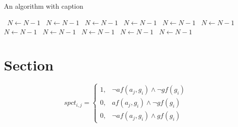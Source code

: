 \documentclass[a4paper]{article}
\begin{document}
\begin{algorithm}
\caption{An algorithm with caption}
\begin{algorithmic}
\    \State $N \gets N - 1$
\    \State $N \gets N - 1$
\    \State $N \gets N - 1$
\    \State $N \gets N - 1$
\    \State $N \gets N - 1$
\    \State $N \gets N - 1$
\    \State $N \gets N - 1$
\    \State $N \gets N - 1$
\    \State $N \gets N - 1$
\    \State $N \gets N - 1$
\    \State $N \gets N - 1$
\EndWhile
\end{algorithmic}
\end{algorithm}

\section{Section}

\begin{equation}
spct_{i,j} =
\begin{cases}
1, & \text{$\neg af(a_j,g_i) \wedge \neg gf(g_i)$}\\
0, & \text{$af(a_j,g_i) \wedge \neg gf(g_i)$}\\
0, & \text{$\neg af(a_j,g_i) \wedge gf(g_i)$}
\end{cases}
\end{equation}
\end{document}
